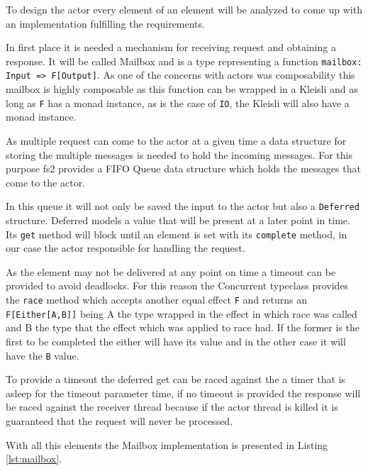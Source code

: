\documentclass[../main.tex]{subfiles}
\begin{document}
To design the actor every element of an element will be analyzed to come up with
an implementation fulfilling the requirements.

In first place it is needed a mechanism for receiving request and obtaining a
response. It will be called Mailbox and is a type representing a function
\lstinline{mailbox: Input => F[Output]}. As one of the concerns with actors was
composability this mailbox is highly composable as this function can be wrapped
in a Kleisli and as long as \texttt{F} has a monad instance, as is the case of
\texttt{IO}, the Kleisli will also have a monad instance.

As multiple request can come to the actor at a given time a data structure for
storing the multiple messages is needed to hold the incoming messages. For this
purpose fs2 provides a FIFO Queue data structure which holds the messages that
come to the actor.

In this queue it will not only be saved the input to the actor but also a
\texttt{Deferred} structure. Deferred models a value that will be present at a
later point in time. Its \texttt{get} method will block until an element is set
with its \texttt{complete} method, in our case the actor responsible for
handling the request.

As the element may not be delivered at any point on time
a timeout can be provided to avoid deadlocks. For this reason the Concurrent
typeclass provides the \texttt{race} method which accepts another equal effect
\texttt{F} and returns an \texttt{F[Either[A,B]]} being A the type
wrapped in the effect in which race was called and B the type that the effect
which was applied to race had. If the former is the first to be completed the
either will have its value and in the other case it will have the \texttt{B}
value.

To provide a timeout the deferred get can be raced against the a timer that is
asleep for the timeout parameter time, if no timeout is provided the response
will be raced against the receiver thread because if the actor thread is killed
it is guaranteed that the request will never be processed.

With all this elements the Mailbox implementation is presented in Listing
\ref{lst:mailbox}.
\end{document}

